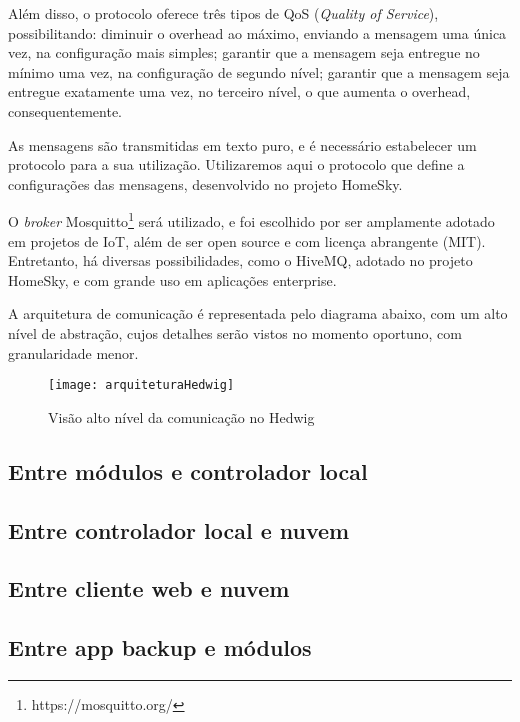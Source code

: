 Além disso, o protocolo \wmqtt{} oferece três tipos de QoS (\textit{Quality of Service}), possibilitando: diminuir o overhead ao máximo, enviando a mensagem uma única vez, na configuração mais simples; garantir que a mensagem seja entregue no mínimo uma vez, na configuração de segundo nível; garantir que a mensagem seja entregue exatamente uma vez, no terceiro nível, o que aumenta o overhead, consequentemente.

As mensagens são transmitidas em texto puro, e é necessário estabelecer um protocolo para a sua utilização. Utilizaremos aqui o protocolo que define a configurações das mensagens, desenvolvido no projeto HomeSky.

O \textit{broker} Mosquitto\footnote{https://mosquitto.org/} será utilizado, e foi escolhido por ser amplamente adotado em projetos de IoT, além de ser open source e com licença abrangente (MIT). Entretanto, há diversas possibilidades, como o HiveMQ, adotado no projeto HomeSky, e com grande uso em aplicações enterprise.

A arquitetura de comunicação é representada pelo diagrama abaixo, com um alto nível de abstração, cujos detalhes serão vistos no momento oportuno, com granularidade menor.

\begin{figure}[H]
	\centering
	\caption{Visão alto nível da comunicação no Hedwig}
  \texttt{[image: arquiteturaHedwig]}
\label{fig:diagramaComunicacao}
\end{figure}

\subsection{Entre módulos e controlador local}
\subsection{Entre controlador local e nuvem}
\subsection{Entre cliente web e nuvem}
\subsection{Entre app backup e módulos}
